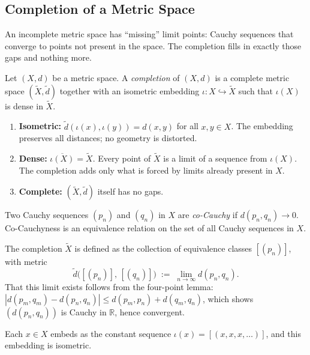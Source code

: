 \subsection{Completion of a Metric Space}
\label{sec:completion}

An incomplete metric space has ``missing'' limit points: Cauchy sequences
that converge to points not present in the space.
The completion fills in exactly those gaps and nothing more.

\begin{tcolorbox}[colback=propbox, colframe=propborder, arc=2pt,
  left=6pt, right=6pt, top=4pt, bottom=4pt,
  title={\small\textbf{Definition (Completion)}},
  fonttitle=\small\bfseries]
\begin{definition}[Completion]
\label{def:completion}
Let $(X,d)$ be a metric space.
A \emph{completion} of $(X,d)$ is a complete metric space
$(\widetilde{X}, \widetilde{d})$ together with an isometric embedding
$\iota : X \hookrightarrow \widetilde{X}$ such that $\iota(X)$ is dense
in $\widetilde{X}$.
\end{definition}
\end{tcolorbox}

\begin{remark*}
\begin{enumerate}[label=(\roman*), leftmargin=2em]
  \item \textbf{Isometric:}
        $\widetilde{d}(\iota(x), \iota(y)) = d(x,y)$ for all $x,y \in X$.
        The embedding preserves all distances; no geometry is distorted.
  \item \textbf{Dense:}
        $\overline{\iota(X)} = \widetilde{X}$.
        Every point of $\widetilde{X}$ is a limit of a sequence from
        $\iota(X)$.
        The completion adds only what is forced by limits already present
        in $X$.
  \item \textbf{Complete:}
        $(\widetilde{X}, \widetilde{d})$ itself has no gaps.
\end{enumerate}
\end{remark*}

\begin{remark*}
\label{rem:co-cauchy}
Two Cauchy sequences $(p_n)$ and $(q_n)$ in $X$ are \emph{co-Cauchy} if
$d(p_n, q_n) \to 0$.
Co-Cauchyness is an equivalence relation on the set of all Cauchy sequences
in $X$.

The completion $\widetilde{X}$ is defined as the collection of
equivalence classes $[(p_n)]$, with metric
\[
  \widetilde{d}\bigl([(p_n)],\, [(q_n)]\bigr)
  \;:=\;
  \lim_{n\to\infty} d(p_n, q_n).
\]
That this limit exists follows from the four-point lemma:
$|d(p_m,q_m) - d(p_n,q_n)| \le d(p_m,p_n) + d(q_m,q_n)$,
which shows $(d(p_n,q_n))$ is Cauchy in $\mathbb{R}$, hence convergent.

Each $x \in X$ embeds as the constant sequence $\iota(x) = [(x,x,x,\ldots)]$,
and this embedding is isometric.
\end{remark*}

